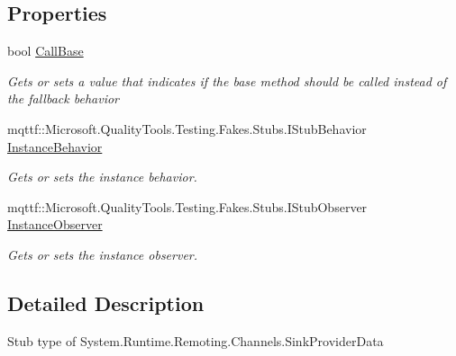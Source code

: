 \subsection*{Properties}
\begin{DoxyCompactItemize}
\item 
bool \hyperlink{class_system_1_1_runtime_1_1_remoting_1_1_channels_1_1_fakes_1_1_stub_sink_provider_data_a3997a3ae44723e26754740cf1907b195}{Call\-Base}
\begin{DoxyCompactList}\small\item\em Gets or sets a value that indicates if the base method should be called instead of the fallback behavior\end{DoxyCompactList}\item 
mqttf\-::\-Microsoft.\-Quality\-Tools.\-Testing.\-Fakes.\-Stubs.\-I\-Stub\-Behavior \hyperlink{class_system_1_1_runtime_1_1_remoting_1_1_channels_1_1_fakes_1_1_stub_sink_provider_data_a114eb5f6abafc6bdcf11a41f4371dad0}{Instance\-Behavior}
\begin{DoxyCompactList}\small\item\em Gets or sets the instance behavior.\end{DoxyCompactList}\item 
mqttf\-::\-Microsoft.\-Quality\-Tools.\-Testing.\-Fakes.\-Stubs.\-I\-Stub\-Observer \hyperlink{class_system_1_1_runtime_1_1_remoting_1_1_channels_1_1_fakes_1_1_stub_sink_provider_data_aa949f162c60091bc69ea1670288aa1a0}{Instance\-Observer}
\begin{DoxyCompactList}\small\item\em Gets or sets the instance observer.\end{DoxyCompactList}\end{DoxyCompactItemize}


\subsection{Detailed Description}
Stub type of System.\-Runtime.\-Remoting.\-Channels.\-Sink\-Provider\-Data



